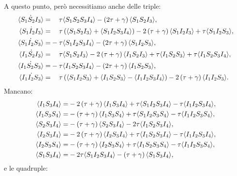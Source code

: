 A questo punto, per\`o necessitiamo anche delle triple: 
\begin{equation*}
 \begin{aligned}
 		\dot{\angol{S_1S_2I_3}}=&\spa \tau \angol{S_1S_2S_3I_4} -\tonde{ 2\tau + \gamma} \angol{S_1S_2I_3},\\
 		\dot{\angol{S_1I_2I_3}} =&\spa \tau \tonde{ \angol{S_1S_2I_3}+\angol{S_1I_2S_3I_4} } -2\tonde{ \tau + \gamma} \angol{S_1I_2I_3} + \tau \angol{S_1 I_2 S_3},\\
 		\dot{\angol{S_1I_2S_3}} =&-\tau \angol{S_1I_2S_3I_4} -\tonde{ 2\tau + \gamma} \angol{S_1I_2S_3},\\
 		\dot{\angol{I_1S_2I_3}} =&\spa \tau  \angol{S_1S_2I_3} -2\tonde{ \tau + \gamma} \angol{I_1S_2I_3} + \tau \angol{I_1S_2S_3}+\tau \angol{I_1S_2S_3I_4},\\
 		\dot{\angol{I_1S_2S_3}}=&-\tau \angol{ I_1S_2S_3I_4}-\tonde{ 2 \tau + \gamma} \angol{I_1S_2S_3},\\
 		\dot{\angol{I_1I_2S_3}} =&\spa\tau \tonde{ \angol{S_1I_2S_3}+ \angol{I_1S_2S_3} - \angol{I_1I_2S_3I_4}} -2\tonde{ \tau + \gamma} \angol{I_1I_2S_3}.
 	\end{aligned}
 \end{equation*}
 Mancano:
 \begin{equation*}
 	\begin{aligned}
 	\langle I_1S_3I_4 \rangle=&-2
 	\left(  \tau + \gamma \right)\langle  I_1 S_3 I_4 \rangle + \tau \langle S_1I_2S_3I_4 \rangle-\tau \langle  I_1I_2S_3I_4 \rangle,\\
 	\langle I_1S_3 S_4 \rangle =& - \left(  \tau + \gamma \right)  \langle I_1 S_3 S_4 \rangle + \tau\langle S_1I_2S_3S_4 \rangle -\tau \langle I_1I_2S_3S_4 \rangle,\\
\langle S_2S_3I_4 \rangle=& 	-\left(  \tau + \gamma  \right) \langle S_2S_3I_4 \rangle  - 2\tau \langle  I_1S_2S_3I_4 \rangle, \\
 	\langle I_2S_3I_4 \rangle= &-2\left(  \tau + \gamma \right)  	\langle I_2S_3I_4 \rangle + \tau \langle  I_1S_2S_3I_4 \rangle - \tau \langle  I_1I_2S_3 I_4 \rangle, \\
 	\langle I_2S_3S_4 \rangle=&- \left(  \tau + \gamma \right)\langle  I_2 S_3S_4 \rangle +\tau \langle  I_1S_2S_3S_4 \rangle - \tau \langle  I_1I_2 S_3S_4 \rangle,\\
 	\langle  S_1S_3I_4 \rangle =&- 2\tau \langle  S_1I_2S_3I_4 \rangle -\left(  \tau + \gamma \right) \langle  S_1S_3I_4 \rangle,
 	\end{aligned}
 \end{equation*}
e le quadruple:
